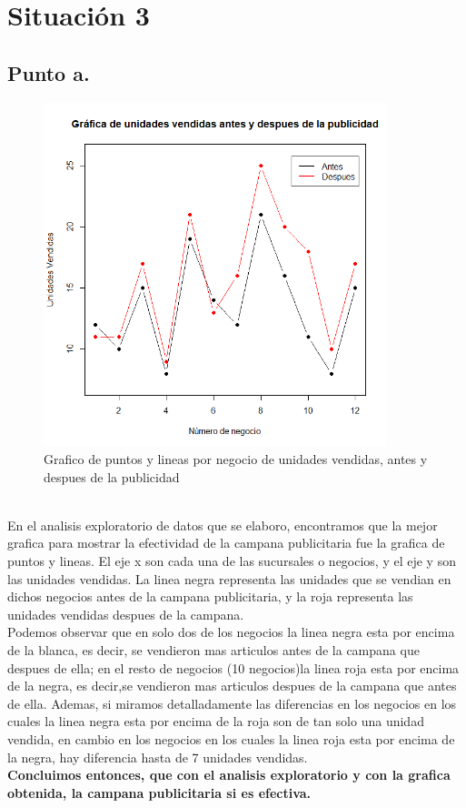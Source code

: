 \documentclass[letterpaper,12pt,onecolumn,titlepage]{article}
\begin{document}
\pagebreak\section{Situaci\'{o}n 3}
\subsection{Punto a.}
 \begin{figure}[!h]
    \begin{center}
        \includegraphics[width=10cm]{Figuras/Grafico2.png}
        \caption{Grafico de puntos y lineas por negocio de unidades vendidas, antes y despues de la publicidad}
        \label{fig:Densidad}
    \end{center}
\end{figure}

~\\ En el analisis exploratorio de datos que se elaboro, encontramos que la mejor grafica para mostrar la efectividad de la campana publicitaria fue la grafica de puntos y lineas. El eje x son cada una de las sucursales o negocios, y el eje y son las unidades vendidas. La linea negra representa las unidades que se vendian en dichos negocios antes de la campana publicitaria, y la roja representa las unidades vendidas despues de la campana.
~\\ Podemos observar que en solo dos de los negocios la linea negra esta por encima de la blanca, es decir, se vendieron mas articulos antes de la campana que despues de ella; en el resto de negocios (10 negocios)la linea roja esta por encima de la negra, es decir,se vendieron mas articulos despues de la campana que antes de ella. Ademas, si miramos detalladamente las diferencias en los negocios en los cuales la linea negra esta por encima de la roja son de tan solo una unidad vendida, en cambio en los negocios en los cuales la linea roja esta por encima de la negra, hay diferencia hasta de 7 unidades vendidas.
~\\ \textbf{Concluimos entonces, que con el analisis exploratorio y con la grafica obtenida, la campana publicitaria si es efectiva.}
\end{document}
